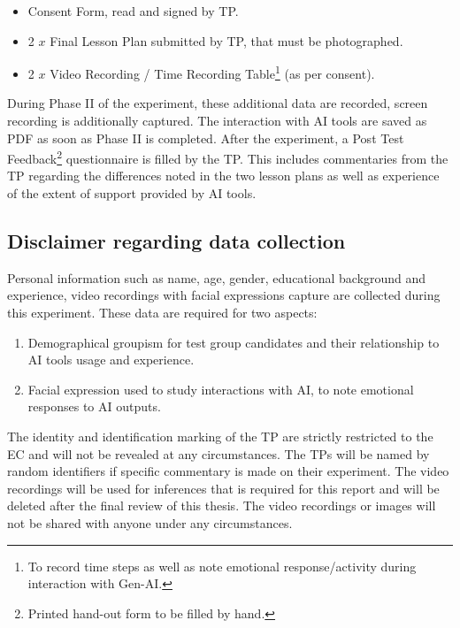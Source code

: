 \begin{itemize}
    \item Consent Form, read and signed by TP.
    \item 2 $x$ Final Lesson Plan submitted by TP, that must be photographed.
    \item 2 $x$ Video Recording / Time Recording Table\footnote[1]{To record time steps as well as note emotional response/activity during interaction with Gen-AI.} (as per consent).
\end{itemize}


\vspace{5mm}

\noindent During Phase II of the experiment, these additional data are recorded, screen recording is additionally captured. The interaction with AI tools are saved as PDF as soon as Phase II is completed.
After the experiment, a Post Test Feedback\footnote[2]{Printed hand-out form to be filled by hand.} questionnaire is filled by the TP. This includes commentaries from the TP regarding the differences noted in the two lesson plans as well as experience of the extent of support provided by AI tools.



\subsection{Disclaimer regarding data collection}

Personal information such as name, age, gender, educational background and experience, video recordings with facial expressions capture are collected during this experiment. These data are required for two aspects:

\begin{enumerate}
    \item Demographical groupism for test group candidates and their relationship to AI tools usage and experience.
    \item Facial expression used to study interactions with AI, to note emotional responses to AI outputs.
\end{enumerate}

\noindent The identity and identification marking of the TP are strictly restricted to the EC and will not be revealed at any circumstances. The TPs will be named by random identifiers if specific commentary is made on their experiment. The video recordings will be used for inferences that is required for this report and will be deleted after the final review of this thesis. The video recordings or images will not be shared with anyone under any circumstances.

